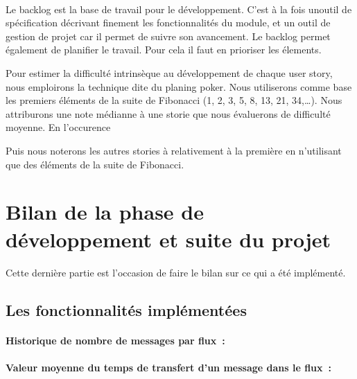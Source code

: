 			\paragraph{}%
			Le backlog est la base de travail pour le développement. C'est à la fois
			unoutil de spécification décrivant finement les fonctionnalités du module, et
			un outil de gestion de projet car il permet de suivre son avancement. Le
			backlog permet également de planifier le travail. Pour cela il faut en
			prioriser les élements.\newline
			
			
			Pour estimer la difficulté intrinsèque au développement de chaque user story,
			nous emploirons la technique dite du planing poker. Nous utiliserons comme
			base les premiers éléments de la suite de Fibonacci (1, 2, 3, 5, 8, 13, 21,
			34,\ldots). Nous attriburons une note médianne à une storie que nous
			évaluerons de difficulté moyenne. En l'occurence %
			
			Puis nous noterons les autres stories à relativement à la première en
			n'utilisant que des éléments de la suite de Fibonacci.
			
	
	\section{Bilan de la phase de développement et suite du projet}
		\paragraph{}
		Cette dernière partie est l'occasion de faire le bilan sur ce qui a été
		implémenté.
		
		\subsection{Les fonctionnalités implémentées}
			\paragraph{}%
		
			\paragraph{Historique de nombre de messages par flux~: }
			
			\paragraph{Valeur moyenne du temps de transfert d'un message dans le flux~: }
		
